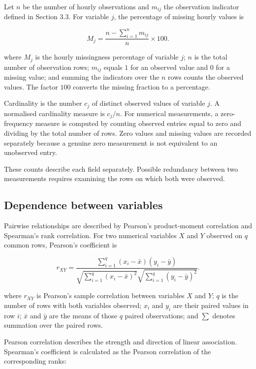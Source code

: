 Let \(n\) be the number of hourly observations and \(m_{ij}\) the
observation indicator defined in Section 3.3. For variable \(j\), the
percentage of missing hourly values is

\[
M_j=\frac{n-\sum_{i=1}^{n}m_{ij}}{n}\times100.\tag{3.4.1}
\]

\noindent where \(M_j\) is the hourly missingness percentage of variable \(j\);
\(n\) is the total number of observation rows; \(m_{ij}\) equals \(1\)
for an observed value and \(0\) for a missing value; and summing the
indicators over the \(n\) rows counts the observed values. The factor
\(100\) converts the missing fraction to a percentage.

\noindent Cardinality is the number \(c_j\) of distinct observed values of
variable \(j\). A normalised cardinality measure is \(c_j/n\). For
numerical measurements, a zero-frequency measure is computed by counting
observed entries equal to zero and dividing by the total number of rows.
Zero values and missing values are recorded separately because a genuine
zero measurement is not equivalent to an unobserved entry.

\noindent These counts describe each field separately. Possible redundancy between two measurements requires examining the rows on which both were observed.

\subsection{Dependence between variables}\label{dependence-between-variables}

Pairwise relationships are described by Pearson's product-moment
correlation and Spearman's rank correlation. For two numerical variables
\(X\) and \(Y\) observed on \(q\) common rows, Pearson's coefficient is

\[
r_{XY}=
\frac{\sum_{i=1}^{q}(x_i-\bar{x})(y_i-\bar{y})}
{\sqrt{\sum_{i=1}^{q}(x_i-\bar{x})^2}
	\sqrt{\sum_{i=1}^{q}(y_i-\bar{y})^2}}.\tag{3.4.2}
\]

\noindent where \(r_{XY}\) is Pearson's sample correlation between variables \(X\)
and \(Y\); \(q\) is the number of rows with both variables observed;
\(x_i\) and \(y_i\) are their paired values in row \(i\); \(\bar{x}\)
and \(\bar{y}\) are the means of those \(q\) paired observations; and
\(\sum\) denotes summation over the paired rows.

\noindent Pearson correlation describes the strength and direction of linear
association. Spearman's coefficient is calculated as the Pearson
correlation of the corresponding ranks:

